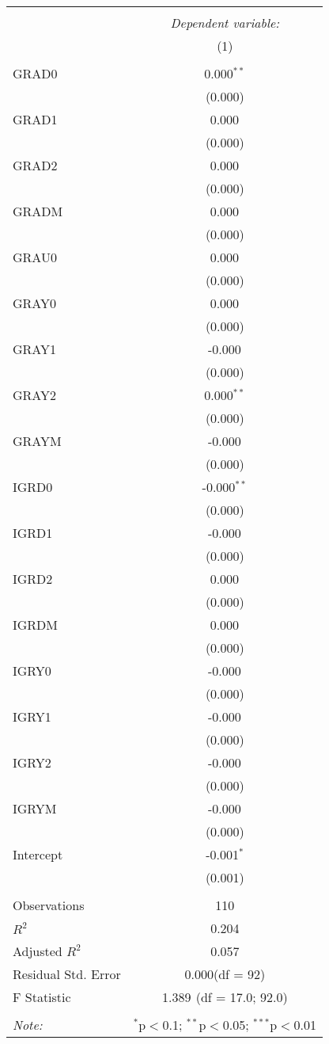 \begin{table}[!htbp] \centering
\begin{tabular}{@{\extracolsep{5pt}}lc}
\\[-1.8ex]\hline
\hline \\[-1.8ex]
& \multicolumn{1}{c}{\textit{Dependent variable:}} \
\cr \cline{1-2}
\\[-1.8ex] & (1) \\
\hline \\[-1.8ex]
 GRAD0 & 0.000$^{**}$ \\
  & (0.000) \\
 GRAD1 & 0.000$^{}$ \\
  & (0.000) \\
 GRAD2 & 0.000$^{}$ \\
  & (0.000) \\
 GRADM & 0.000$^{}$ \\
  & (0.000) \\
 GRAU0 & 0.000$^{}$ \\
  & (0.000) \\
 GRAY0 & 0.000$^{}$ \\
  & (0.000) \\
 GRAY1 & -0.000$^{}$ \\
  & (0.000) \\
 GRAY2 & 0.000$^{**}$ \\
  & (0.000) \\
 GRAYM & -0.000$^{}$ \\
  & (0.000) \\
 IGRD0 & -0.000$^{**}$ \\
  & (0.000) \\
 IGRD1 & -0.000$^{}$ \\
  & (0.000) \\
 IGRD2 & 0.000$^{}$ \\
  & (0.000) \\
 IGRDM & 0.000$^{}$ \\
  & (0.000) \\
 IGRY0 & -0.000$^{}$ \\
  & (0.000) \\
 IGRY1 & -0.000$^{}$ \\
  & (0.000) \\
 IGRY2 & -0.000$^{}$ \\
  & (0.000) \\
 IGRYM & -0.000$^{}$ \\
  & (0.000) \\
 Intercept & -0.001$^{*}$ \\
  & (0.001) \\
\hline \\[-1.8ex]
 Observations & 110 \\
 $R^2$ & 0.204 \\
 Adjusted $R^2$ & 0.057 \\
 Residual Std. Error & 0.000(df = 92)  \\
 F Statistic & 1.389$^{}$ (df = 17.0; 92.0) \\
\hline
\hline \\[-1.8ex]
\textit{Note:} & \multicolumn{1}{r}{$^{*}$p$<$0.1; $^{**}$p$<$0.05; $^{***}$p$<$0.01} \\
\end{tabular}
\end{table}